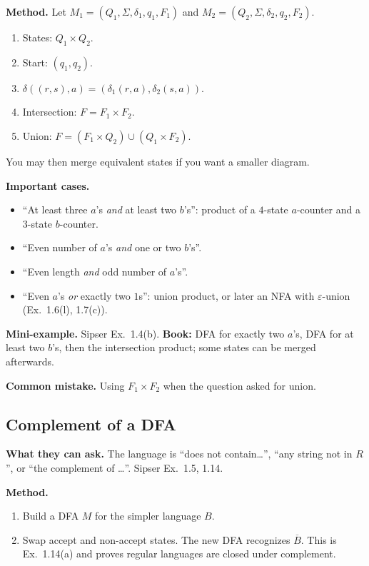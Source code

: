 \documentclass[11pt,a4paper]{article}
\newcommand{\eps}{\varepsilon}
\begin{document}
\textbf{Method.}
Let $M_1=(Q_1,\Sigma,\delta_1,q_1,F_1)$ and
$M_2=(Q_2,\Sigma,\delta_2,q_2,F_2)$.
\begin{enumerate}
  \item States: $Q_1\times Q_2$.
  \item Start: $(q_1,q_2)$.
  \item $\delta((r,s),a)=(\delta_1(r,a),\delta_2(s,a))$.
  \item Intersection: $F=F_1\times F_2$.
  \item Union: $F=(F_1\times Q_2)\cup(Q_1\times F_2)$.
\end{enumerate}
You may then merge equivalent states if you want a smaller diagram.

\textbf{Important cases.}
\begin{itemize}[nosep]
  \item ``At least three $a$'s \emph{and} at least two $b$'s'': product
        of a $4$-state $a$-counter and a $3$-state $b$-counter.
  \item ``Even number of $a$'s \emph{and} one or two $b$'s''.
  \item ``Even length \emph{and} odd number of $a$'s''.
  \item ``Even $a$'s \emph{or} exactly two $1$s'': union product, or
        later an NFA with $\eps$-union (Ex.~1.6(l), 1.7(c)).
\end{itemize}

\textbf{Mini-example.}
Sipser Ex.~1.4(b). \textbf{Book:} DFA for exactly two $a$'s, DFA for
at least two $b$'s, then the intersection product; some states can be
merged afterwards.

\textbf{Common mistake.}
Using $F_1\times F_2$ when the question asked for union.

\subsection{Complement of a DFA}
\label{type:complement}

\textbf{What they can ask.}
The language is ``does not contain\ldots'', ``any string not in
$R$'', or ``the complement of \ldots''. Sipser Ex.~1.5, 1.14.

\textbf{Method.}
\begin{enumerate}
  \item Build a DFA $M$ for the simpler language $B$.
  \item Swap accept and non-accept states. The new DFA recognizes
        $\overline{B}$. This is Ex.~1.14(a) and proves regular
        languages are closed under complement.
\end{enumerate}
\end{document}

